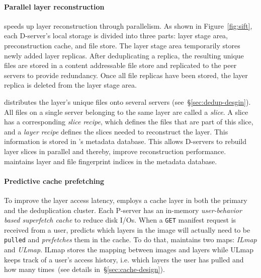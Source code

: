 \paragraph{Parallel layer reconstruction}
%
\sysname speeds up layer reconstruction through parallelism.
%
As shown in Figure~\ref{fig:sift}, each D-server's local storage is divided
into three parts: layer stage area, preconstruction cache, and file store.
%
The layer stage area temporarily stores newly added layer replicas.
%
After deduplicating a replica, the resulting unique files are stored in a
content addressable file store and replicated to the peer servers to provide
redundancy. Once all file replicas have been stored, the layer replica is deleted
from the layer stage area.%
%

\sysname distributes the layer's unique files onto several servers
(see~\S\ref{sec:dedup-desgin}).
%
All files on a single server belonging to the same layer are called a
\emph{slice}.
%
A slice has a corresponding \emph{slice recipe}, which defines the files that
are part of this slice, and a \emph{layer recipe} defines the slices needed to
reconstruct the layer.
%
This information is stored in \sysname{}'s metadata database.
%
This allows D-servers to rebuild layer slices in parallel and thereby, improve
reconstruction performance.
%
\sysname maintains layer and file fingerprint indices in the
metadata database.




\paragraph{Predictive cache prefetching}
%
To improve the layer access latency, \sysname employs a cache layer in both the
primary and the deduplication cluster.
%
Each P-server has an in-memory \emph{user-behavior based superfetch cache} to
reduce disk I/Os.
%
When a \texttt{GET} manifest request is received from a user, \sysname
predicts which layers in the image will actually need to be \texttt{pulled} and
\emph{prefetches} them in the cache.
%
To do that, \sysname maintains two maps: \emph{ILmap} and \emph{ULmap}.
%
ILmap stores the mapping between images and layers while ULmap keeps track of a
user's access history, i.e. which layers the user has pulled and how many
times~(see details in~\S\ref{sec:cache-design}).

